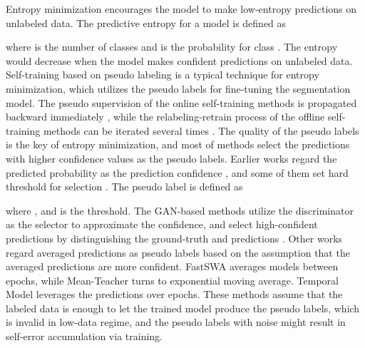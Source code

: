 \documentclass[journal]{IEEEtran}
\begin{document}
Entropy minimization encourages the model to make low-entropy predictions on unlabeled data. The predictive entropy for a model is defined as

where  is the number of classes and  is the probability for class . The entropy would decrease when the model makes confident predictions on unlabeled data. 
Self-training based on pseudo labeling is a typical technique for entropy minimization, which utilizes the pseudo labels for fine-tuning the segmentation model. The pseudo 
supervision of the online self-training methods is propagated backward immediately \cite{Pseudo-label}, while the relabeling-retrain process of the offline self-training 
methods can be iterated several times \cite{zou2018unsupervised, Naive-Student, rethinking, 2020DMT, ALS4, ibrahim2020semi, mendel2020semi}. The quality of the pseudo labels 
is the key of entropy minimization, and most of methods select the predictions with higher confidence values as the pseudo labels. Earlier works 
regard the predicted probability as the prediction confidence \cite{li2017triple, luo2018smooth, springenberg2015unsupervised}, and some of them 
set hard threshold for selection \cite{Pseudo-label,zou2018unsupervised}. The pseudo label  is defined as 

where , and  is the threshold. The GAN-based methods utilize the discriminator as the selector to 
approximate the confidence, and select high-confident predictions by distinguishing the ground-truth and predictions \cite{ALS4, souly2017semi, 8935407}. Other works regard 
averaged predictions as pseudo labels based on the assumption that the averaged predictions are more confident. FastSWA \cite{athiwaratkun2018there} averages models between 
epochs, while Mean-Teacher \cite{MT} turns to exponential moving average. Temporal Model \cite{laine2016temporal} leverages the predictions over epochs. These methods assume 
that the labeled data is enough to let the trained model produce the pseudo labels, which is invalid in low-data regime, and the pseudo labels with noise might result in 
self-error accumulation via training. 
\end{document}
